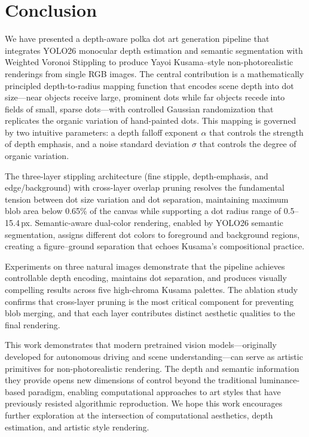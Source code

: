 \section{Conclusion}
\label{sec:conclusion}

We have presented a depth-aware polka dot art generation pipeline that
integrates YOLO26 monocular depth estimation and semantic segmentation
with Weighted Voronoi Stippling to produce Yayoi Kusama--style
non-photorealistic renderings from single RGB images. The central
contribution is a mathematically principled depth-to-radius mapping
function that encodes scene depth into dot size---near objects receive
large, prominent dots while far objects recede into fields of small,
sparse dots---with controlled Gaussian randomization that replicates
the organic variation of hand-painted dots. This mapping is governed
by two intuitive parameters: a depth falloff exponent $\alpha$ that
controls the strength of depth emphasis, and a noise standard
deviation $\sigma$ that controls the degree of organic variation.

The three-layer stippling architecture (fine stipple, depth-emphasis,
and edge/background) with cross-layer overlap pruning resolves the
fundamental tension between dot size variation and dot separation,
maintaining maximum blob area below 0.65\% of the canvas while
supporting a dot radius range of 0.5--15.4\,px. Semantic-aware dual-color
rendering, enabled by YOLO26 semantic segmentation, assigns different
dot colors to foreground and background regions, creating a
figure--ground separation that echoes Kusama's compositional practice.

Experiments on three natural images demonstrate that the pipeline achieves
controllable depth encoding, maintains dot separation, and produces
visually compelling results across five high-chroma Kusama palettes.
The ablation study confirms that cross-layer pruning is the most
critical component for preventing blob merging, and that each
layer contributes distinct aesthetic qualities to the final rendering.

This work demonstrates that modern pretrained vision models---originally
developed for autonomous driving and scene understanding---can serve as
artistic primitives for non-photorealistic rendering. The depth and
semantic information they provide opens new dimensions of control
beyond the traditional luminance-based paradigm, enabling computational
approaches to art styles that have previously resisted algorithmic
reproduction. We hope this work encourages further exploration at the
intersection of computational aesthetics, depth estimation, and
artistic style rendering.
